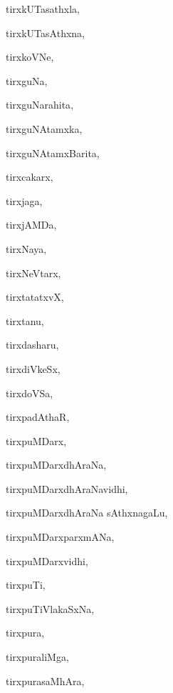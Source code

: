 \begin{multicols}{3}
{\noindent
{tirxkUTasathxla}, \pageref{tirxkUTasathxla}

\noindent
{tirxkUTasAthxna}, \pageref{tirxkUTasAthxna}

\noindent
{tirxkoVNe}, \pageref{tirxkoVNe}

\noindent
{tirxguNa}, \pageref{tirxguNa}

\noindent
{tirxguNarahita}, \pageref{tirxguNarahita}

\noindent
{tirxguNAtamxka}, \pageref{tirxguNAtamxka}

\noindent
{tirxguNAtamxBarita}, \pageref{tirxguNAtamxBarita}

\noindent
{tirxcakarx}, \pageref{tirxcakarx}

\noindent
{tirxjaga}, \pageref{tirxjaga}

\noindent
{tirxjAMDa}, \pageref{tirxjAMDa}

\noindent
{tirxNaya}, \pageref{tirxNaya}

\noindent
{tirxNeVtarx}, \pageref{tirxNeVtarx}

\noindent
{tirxtatatxvX}, \pageref{tirxtatatxvX}

\noindent
{tirxtanu}, \pageref{tirxtanu}

\noindent
{tirxdasharu}, \pageref{tirxdasharu}

\noindent
{tirxdiVkeSx}, \pageref{tirxdiVkeSx}

\noindent
{tirxdoVSa}, \pageref{tirxdoVSa}

\noindent
{tirxpadAthaR}, \pageref{tirxpadAthaR}

\noindent
{tirxpuMDarx}, \pageref{tirxpuMDarx}

\noindent
{tirxpuMDarxdhAraNa}, \pageref{tirxpuMDarxdhAraNa}

\noindent
{tirxpuMDarxdhAraNavidhi}, \pageref{tirxpuMDarxdhAraNavidhi}

\noindent
{tirxpuMDarxdhAraNa sAthxna\-gaLu}, \pageref{tirxpuMDarxdhAraNa sAthxnagaLu}

\noindent
{tirxpuMDarxparxmANa}, \pageref{tirxpuMDarxparxmANa}

\noindent
{tirxpuMDarxvidhi}, \pageref{tirxpuMDarxvidhi}

\noindent
{tirxpuTi}, \pageref{tirxpuTi}

\noindent
{tirxpuTiVlakaSxNa}, \pageref{tirxpuTiVlakaSxNa}

\noindent
{tirxpura}, \pageref{tirxpura}

\noindent
{tirxpuraliMga}, \pageref{tirxpuraliMga}

\noindent
{tirxpurasaMhAra}, \pageref{tirxpurasaMhAra}

}
\end{multicols}
